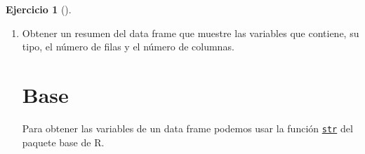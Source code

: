 \documentclass[
  a4paper,
]{scrreport}
\newenvironment{Shaded}{\begin{snugshade}}{\end{snugshade}}
\newcommand{\ExtensionTok}[1]{\textcolor[rgb]{0.00,0.23,0.31}{#1}}
\newcommand{\FunctionTok}[1]{\textcolor[rgb]{0.28,0.35,0.67}{#1}}
\newcommand{\NormalTok}[1]{\textcolor[rgb]{0.00,0.23,0.31}{#1}}
\newcommand{\OtherTok}[1]{\textcolor[rgb]{0.00,0.23,0.31}{#1}}
\newcommand{\StringTok}[1]{\textcolor[rgb]{0.13,0.47,0.30}{#1}}
\theoremstyle{definition}
\newtheorem{exercise}{Ejercicio}[chapter]
\theoremstyle{remark}
\begin{document}
\begin{exercise}[]
\begin{enumerate}
\begin{tcolorbox}
  \section{Tidyverse}

\begin{Shaded}
\begin{Highlighting}[]
\FunctionTok{library}\NormalTok{(tidyverse)}
\NormalTok{df }\OtherTok{\textless{}{-}} \FunctionTok{read\_csv}\NormalTok{(}\StringTok{"https://aprendeconalf.es/estadistica{-}practicas{-}r/datos/colesterol.csv"}\NormalTok{)}
\end{Highlighting}
\end{Shaded}

  \section{Copilot}

\begin{Shaded}
\begin{Highlighting}[]
\ExtensionTok{Crear}\NormalTok{ un data frame de nombre df con los datos de todos los pacientes del estudio a partir del fichero https://aprendeconalf.es/estadistica{-}practicas{-}r/datos/colesterol.csv.}
\end{Highlighting}
\end{Shaded}

  \end{tcolorbox}
\item
  Obtener un resumen del data frame que muestre las variables que
  contiene, su tipo, el número de filas y el número de columnas.

  \begin{tcolorbox}[enhanced jigsaw, colframe=quarto-callout-tip-color-frame, toprule=.15mm, bottomtitle=1mm, breakable, opacitybacktitle=0.6, toptitle=1mm, colback=white, bottomrule=.15mm, title=\textcolor{quarto-callout-tip-color}{\faLightbulb}\hspace{0.5em}{Solución}, arc=.35mm, left=2mm, titlerule=0mm, rightrule=.15mm, coltitle=black, leftrule=.75mm, opacityback=0, colbacktitle=quarto-callout-tip-color!10!white]

  \section{Base}

  Para obtener las variables de un data frame podemos usar la función
  \href{https://www.rdocumentation.org/packages/base/versions/3.6.2/topics/str}{\texttt{str}}
  del paquete base de R.


\end{tcolorbox}
\end{enumerate}
\end{exercise}
\end{document}

